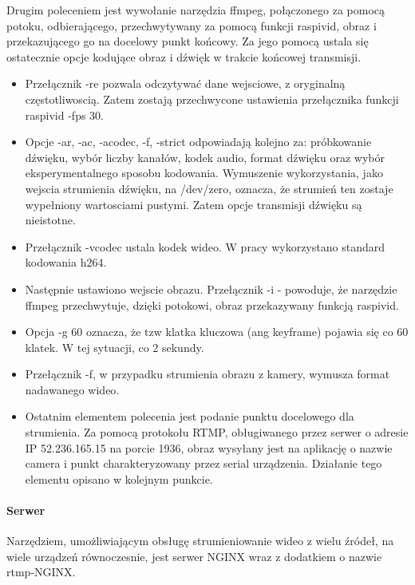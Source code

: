 Drugim poleceniem jest wywołanie narzędzia ffmpeg, połączonego za pomocą potoku, odbierającego, przechwytywany za pomocą funkcji raspivid, obraz i przekazującego go na docelowy punkt końcowy. Za jego pomocą ustala się ostatecznie opcje kodujące obraz i dźwięk w trakcie końcowej transmisji.
\begin{itemize}
\item Przełącznik -re pozwala odczytywać dane wejsciowe, z oryginalną częstotliwoscią. Zatem zostają przechwycone ustawienia przełącznika funkcji raspivid -fps 30.
\item Opcje  -ar, -ac, -acodec, -f, -strict odpowiadają kolejno za: próbkowanie dźwięku, wybór liczby kanałów, kodek audio, format dźwięku oraz wybór eksperymentalnego sposobu kodowania. Wymuszenie wykorzystania, jako wejscia strumienia dźwięku, na /dev/zero, oznacza, że strumień ten zostaje wypełniony wartosciami pustymi. Zatem opcje transmisji dźwięku są nieistotne.
\item Przełącznik -vcodec ustala kodek wideo. W pracy wykorzystano standard kodowania h264.
\item Następnie ustawiono wejscie obrazu. Przełącznik -i - powoduje, że narzędzie ffmpeg przechwytuje, dzięki potokowi, obraz przekazywany funkcją raspivid.
\item Opcja -g 60 oznacza, że tzw klatka kluczowa (ang keyframe) pojawia się co 60 klatek. W tej sytuacji, co 2 sekundy. 
\item Przełącznik -f, w przypadku strumienia obrazu z kamery, wymusza format nadawanego wideo.  
\item Ostatnim elementem polecenia jest podanie punktu docelowego dla strumienia. Za pomocą protokołu RTMP, obługiwanego przez serwer o adresie IP 52.236.165.15 na porcie 1936, obraz wysyłany jest na aplikację o nazwie camera i punkt charakteryzowany przez serial urządzenia. Działanie tego elementu opisano w kolejnym punkcie. 
\end{itemize}

\paragraph{Serwer}
Narzędziem, umożliwiającym obsługę strumieniowanie wideo z wielu źródeł, na wiele urządzeń równoczesnie, jest serwer NGINX wraz z dodatkiem o nazwie rtmp-NGINX.
